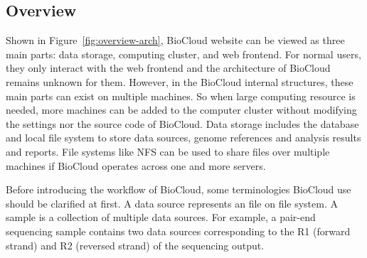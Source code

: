 


\subsection{Overview}

Shown in Figure~\ref{fig:overview-arch}, BioCloud website can be viewed as
three main parts: data storage, computing cluster, and web frontend. For normal
users, they only interact with the web frontend and the architecture of
BioCloud remains unknown for them. However, in the BioCloud internal
structures, these main parts can exist on multiple machines. So when large
computing resource is needed, more machines can be added to the computer
cluster without modifying the settings nor the source code of BioCloud. Data
storage includes the database and local file system to store data sources,
genome references and analysis results and reports. File systems like NFS can
be used to share files over multiple machines if BioCloud operates across one
and more servers.



Before introducing the workflow of BioCloud, some terminologies BioCloud use
should be clarified at first. A data source represents an file on file system.
A sample is a collection of multiple data sources. For example, a pair-end
sequencing sample contains two data sources corresponding to the R1 (forward
strand) and R2 (reversed strand) of the sequencing output.



